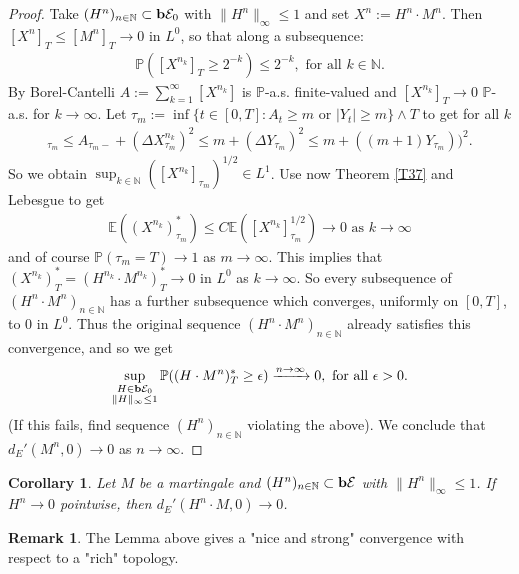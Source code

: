 \documentclass[12pt,a4paper, twoside]{article}
\newtheorem{cor}{Corollary}[section]
\theoremstyle{definition}
\newtheorem{rem}{Remark}[section]
\newcommand{\EE}{\mathbb{E}} %
\newcommand{\PP}{\mathbb{P}} %
\newcommand{\simple}{\textbf{\text{b}}\mathcal{E}}
\begin{document}
\begin{proof}
Take $(H^n)_{n \in \mathbb{N}} \subset \simple_0$ with $\|H^n\|_\infty \leq 1$ and set $X^n:= H^n \cdot M^n$. Then $[X^n]_T \leq [M^n]_T \to 0$ in $L^0$, so that along a subsequence:
\begin{align*}
\PP([X^{n_k}]_T \geq 2^{-k}) \leq 2^{-k}, \text{ for all } k \in \mathbb{N}.
\end{align*}
By Borel-Cantelli $A:= \sum_{k=1}^\infty [X^{n_k}]$ is $\PP$-a.s. finite-valued and $[X^{n_k}]_T \to 0$ $\PP$-a.s. for $k \to \infty$. Let $\tau_m := \inf \{ t \in [0,T]: A_t \geq m \text{ or } |Y_t| \geq m \} \wedge T$ to get for all $k$
\begin{align*}
[X^{n_k}]_{\tau_m} \leq A_{\tau_m-} + ( \Delta X_{\tau_m}^{n_k})^2 \leq m + ( \Delta Y_{\tau_m})^2 \leq m + ((m+1) Y_{\tau_m}))^2.
\end{align*}
So we obtain $\sup_{k \in \mathbb{N}} ( [X^{n_k}]_{\tau_m})^{1/2} \in L^1$. Use now Theorem \ref{T37} and Lebesgue to get  
\begin{align*}
\EE( (X^{n_k})_{\tau_m}^*) \leq C \EE( [X^{n_k}]_{\tau_m}^{1/2}) \to 0 \text{ as } k \to \infty
\end{align*}
and of course $\PP( \tau_m = T) \to 1$ as $m \to \infty$. This implies that $(X^{n_k})_T^* = (H^{n_k} \cdot M^{n_k}) _T ^* \to 0$ in $L^0$ as $k \to \infty$. So every subsequence of $(H^n \cdot M^n)_{n \in \mathbb{N}}$ has a further subsequence which converges, uniformly on $[0,T]$, to $0$ in $L^0$. Thus the original sequence $(H^n \cdot M^n)_{n \in \mathbb{N}}$ already satisfies this convergence, and so we get 
\begin{align*}
\sup_{\substack{ H \in \simple_0 \\ \|H\|_\infty \leq 1}} \PP( (H \cdot M^n)_T^* \geq \epsilon) \xrightarrow{n \to \infty} 0, \text{ for all } \epsilon >0. 
\end{align*}
(If this fails, find sequence $(H^n)_{n \in \mathbb{N}}$ violating the above). We conclude that $d_E'(M^n,0) \to 0$ as $n \to \infty$. 
\end{proof}
\begin{cor}\label{C311} Let $M$ be a martingale and $(H^n)_{n \in \mathbb{N}} \subset \simple$ with $\|H^n\|_\infty \leq 1$. If $H^n \to 0$ pointwise, then $d_E' (H^n \cdot M, 0) \to 0$. 
\end{cor}
\begin{rem} The Lemma above gives a "nice and strong" convergence with respect to a "rich" topology.
\end{rem}
\end{document}
